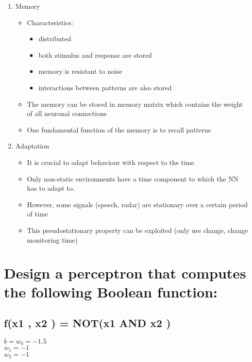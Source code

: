 \documentclass{scrartcl}
\begin{document}
\begin{enumerate}
\item Memory
	\begin{itemize}
	\item Characteristics:
		\begin{itemize}
		\item distributed
		\item both stimulus and response are stored 
		\item memory is resistant to noise
		\item interactions between patterns are also stored
		\end{itemize}
	\item The memory can be stored in memory matrix which contains the weight of all neuronal connections
	\item One fundamental function of the memory is to recall patterns
	\end{itemize}
	
\item Adaptation
	\begin{itemize}
	\item It is crucial to adapt behaviour with respect to the time
	\item Only non-static environments have a time component to which the NN has to adapt to.
	\item  However, some signals (speech, radar) are stationary over a certain period of time
	\item This pseudostationary property can be exploited (only use change, change monitoring time)
	\end{itemize}
\end{enumerate}

\newpage

\section{Design a perceptron that computes the following Boolean function:
}
\subsection{f(x1 , x2 ) = NOT(x1 AND x2 )}

$b = w_{0} = -1.5$\\
$w_{1} = -1$\\
$w_{2} = -1$\\
\end{document}

